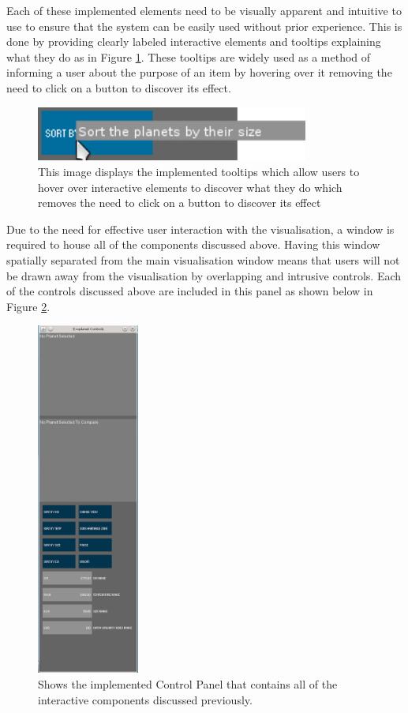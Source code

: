 Each of these implemented elements need to be visually apparent and intuitive to
use to ensure that the system can be
easily used without prior experience. This is done by providing clearly
labeled interactive elements and tooltips explaining what they
do as in Figure \ref{fig:tooltip}. These tooltips are widely used as a method of
informing a
user about the purpose of an item by hovering over it removing the need to
click on a button to discover its effect.

\begin{figure}[H]
  \centering
      \includegraphics[width=0.8\textwidth]{images/tooltip.jpg}
  \caption[Tooltip on hover]{This image displays the implemented tooltips which
allow users to hover over interactive elements to discover what they do which
removes the need to
click on a button to discover its effect}
  \label{fig:tooltip}
\end{figure}

Due to the need for effective user interaction with the visualisation, a window
is required to house all of the components discussed above. Having this window
spatially separated from the main visualisation window means that users will not
be drawn away from the visualisation by overlapping and intrusive controls. Each
of the controls discussed above are included in this panel as shown below in
Figure \ref{fig:nav}.
\clearpage
\begin{figure}[H]
  \centering
      \includegraphics[width=0.3\textwidth]{images/nav.png}
  \caption[Implementation of Control Panel]{Shows the implemented Control Panel
that contains all of the interactive components discussed previously.}
  \label{fig:nav}
\end{figure}

